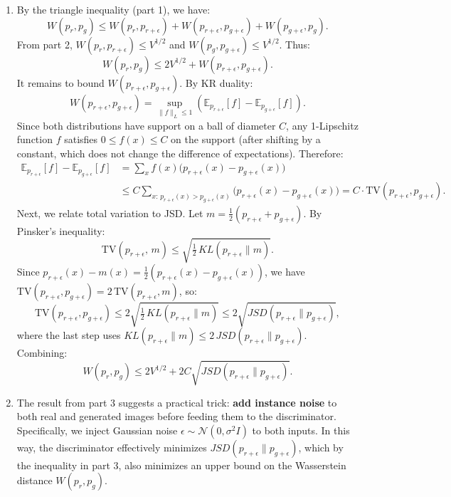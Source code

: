 \documentclass{article}
\begin{document}
{\begin{enumerate}
\[        \]
        Bring them together, we have:
        \[
        W(p_x, p_{x+\epsilon}) \le \sqrt{\mathbb{E}_{\epsilon \sim p(\epsilon)}[\|\epsilon\|_2^2]}=V^{\frac{1}{2}}
        \]
        \item By the triangle inequality (part 1), we have:
        \[
        W(p_r, p_g) \le W(p_r, p_{r+\epsilon}) + W(p_{r+\epsilon}, p_{g+\epsilon}) + W(p_{g+\epsilon}, p_g).
        \]
        From part 2, $W(p_r, p_{r+\epsilon}) \le V^{1/2}$ and $W(p_g, p_{g+\epsilon}) \le V^{1/2}$. Thus:
        \[
        W(p_r, p_g) \le 2V^{1/2} + W(p_{r+\epsilon}, p_{g+\epsilon}).
        \]
        It remains to bound $W(p_{r+\epsilon}, p_{g+\epsilon})$. By KR duality:
        \[
        W(p_{r+\epsilon}, p_{g+\epsilon}) = \sup_{\|f\|_L \le 1} \left( \mathbb{E}_{p_{r+\epsilon}}[f] - \mathbb{E}_{p_{g+\epsilon}}[f] \right).
        \]
        Since both distributions have support on a ball of diameter $C$, any 1-Lipschitz function $f$ satisfies $0 \le f(x) \le C$ on the support (after shifting by a constant, which does not change the difference of expectations). Therefore:
        \begin{align*}
        \mathbb{E}_{p_{r+\epsilon}}[f] - \mathbb{E}_{p_{g+\epsilon}}[f] &= \sum_x f(x)\bigl(p_{r+\epsilon}(x) - p_{g+\epsilon}(x)\bigr) \\
        &\le C \sum_{x:\, p_{r+\epsilon}(x) > p_{g+\epsilon}(x)} \bigl(p_{r+\epsilon}(x) - p_{g+\epsilon}(x)\bigr) = C \cdot \mathrm{TV}(p_{r+\epsilon}, p_{g+\epsilon}).
        \end{align*}
        Next, we relate total variation to JSD. Let $m = \frac{1}{2}(p_{r+\epsilon} + p_{g+\epsilon})$. By Pinsker's inequality:
        \[
        \mathrm{TV}(p_{r+\epsilon},\, m) \le \sqrt{\tfrac{1}{2}\, KL(p_{r+\epsilon} \| m)}.
        \]
        Since $p_{r+\epsilon}(x) - m(x) = \frac{1}{2}(p_{r+\epsilon}(x) - p_{g+\epsilon}(x))$, we have $\mathrm{TV}(p_{r+\epsilon}, p_{g+\epsilon}) = 2\,\mathrm{TV}(p_{r+\epsilon}, m)$, so:
        \[
        \mathrm{TV}(p_{r+\epsilon}, p_{g+\epsilon}) \le 2\sqrt{\tfrac{1}{2}\, KL(p_{r+\epsilon}\|m)} \le 2\sqrt{JSD(p_{r+\epsilon}\|p_{g+\epsilon})},
        \]
        where the last step uses $KL(p_{r+\epsilon}\|m) \le 2\, JSD(p_{r+\epsilon}\|p_{g+\epsilon})$. Combining:
        \[
        W(p_r, p_g) \le 2V^{1/2} + 2C\sqrt{JSD(p_{r+\epsilon}\|p_{g+\epsilon})}.
        \]

        \item The result from part 3 suggests a practical trick: \textbf{add instance noise} to both real and generated images before feeding them to the discriminator. Specifically, we inject Gaussian noise $\epsilon \sim \mathcal{N}(0, \sigma^2 I)$ to both inputs. In this way, the discriminator effectively minimizes $JSD(p_{r+\epsilon}\|p_{g+\epsilon})$, which by the inequality in part 3, also minimizes an upper bound on the Wasserstein distance $W(p_r, p_g)$.


\end{enumerate}}
\end{document}
